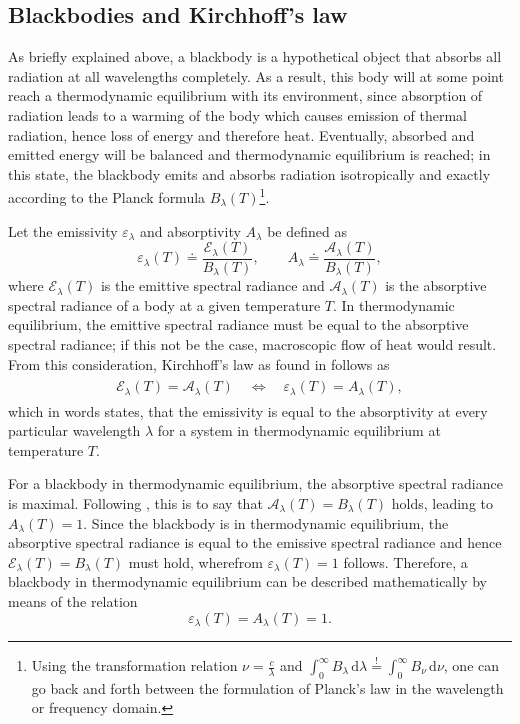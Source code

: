 \documentclass[a4paper,11pt]{report}
\def\fc#1{{\color{black}{#1}}} %
\begin{document}
\subsection{Blackbodies and Kirchhoff's law}
As briefly explained above, a blackbody is a hypothetical object that absorbs all radiation at all wavelengths completely. As a result, this body will at some point reach a thermodynamic equilibrium with its environment, since absorption of radiation leads to a warming of the body which causes emission of thermal radiation, hence loss of energy and therefore heat. Eventually, absorbed and emitted energy will be balanced and thermodynamic equilibrium is reached; in this state, the blackbody emits and absorbs radiation isotropically and exactly according to the Planck formula $B_\lambda(T)$\footnote{Using the transformation relation $\nu = \frac{c}{\lambda}$ and $\int_{0}^{\infty} B_\lambda \,\mathrm{d}\lambda \overset{!}{=} \int_{0}^{\infty} B_\nu\,\mathrm{d}\nu$, one can go back and forth between the formulation of Planck's law in the wavelength or frequency domain.}.

Let the emissivity $\varepsilon_\lambda$ and absorptivity $A_\lambda$ be defined as \begin{equation}
\varepsilon_\lambda(T) \doteq \frac{\mathcal{E}_\lambda(T)}{B_\lambda(T)}, \qquad A_\lambda \doteq \frac{\mathcal{A}_\lambda(T)}{B_\lambda(T)},
\end{equation} where $\mathcal{E}_\lambda(T)$ is the emittive spectral radiance and $\mathcal{A}_\lambda(T)$ is the absorptive spectral radiance of a body at a given temperature $T$. In thermodynamic equilibrium, the emittive spectral radiance must be equal to the absorptive spectral radiance; if this \fc{were} not be the case, macroscopic flow of heat would result. From this consideration, Kirchhoff's law as found in \cite[p.13]{Liou.2002} follows as
\begin{align}\begin{aligned}
\mathcal{E}_\lambda(T) = \mathcal{A}_\lambda(T) \quad \Leftrightarrow \quad \varepsilon_\lambda(T) = A_\lambda(T),
\end{aligned}\end{align} which in words states, that the emissivity is equal to the absorptivity at every particular wavelength $\lambda$ for a system in thermodynamic equilibrium at temperature $T$.

For a blackbody in thermodynamic equilibrium, the absorptive spectral radiance is maximal. Following \cite[p.14]{Liou.2002}, this is to say that $\mathcal{A}_\lambda(T) = B_\lambda(T)$ holds, leading to $A_\lambda(T) = 1$. Since the blackbody is in thermodynamic equilibrium, the absorptive spectral radiance is equal to the emissive spectral radiance and hence $\mathcal{E}_\lambda(T) = B_\lambda(T)$ must hold, wherefrom  $\varepsilon_\lambda(T) = 1$ follows. Therefore, a blackbody in thermodynamic equilibrium can be described mathematically by means of the relation \begin{equation}
\varepsilon_\lambda(T) = A_\lambda(T) = 1.
\end{equation}
\end{document}
